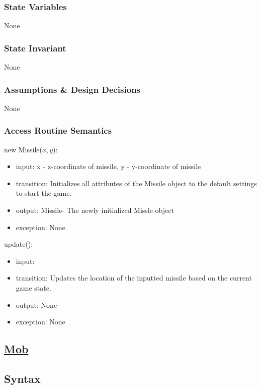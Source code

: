 \documentclass[12pt, titlepage]{article}
\begin{document}
\subsubsection* {State Variables}

None

\subsubsection* {State Invariant}

None

\subsubsection* {Assumptions \& Design Decisions}

None

\subsubsection* {Access Routine Semantics}

\noindent new Missile($x, y$):
\begin{itemize}
\item input: x - x-coordinate of missile, y - y-coordinate of missile
\item transition: Initializes all attributes of the Missile object to the default settings to start the game.
\item output: Missile- The newly initialized Missle object
\item exception: None
\end{itemize}

\noindent update():
\begin{itemize}
\item input: 
\item transition: Updates the location of the inputted missile based on the current game state.
\item output: None
\item exception: None
\end{itemize}

\subsection* {\underline{Mob}} 
\subsection* {Syntax}
\end{document}
